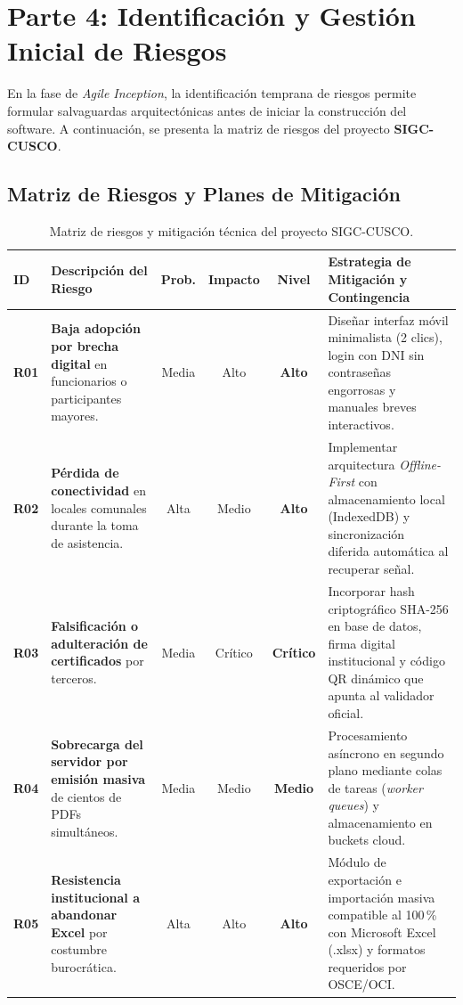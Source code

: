 
\section{Parte 4: Identificación y Gestión Inicial de Riesgos}

En la fase de \textit{Agile Inception}, la identificación temprana de riesgos permite formular salvaguardas arquitectónicas antes de iniciar la construcción del software. A continuación, se presenta la matriz de riesgos del proyecto \textbf{SIGC-CUSCO}.

\subsection{Matriz de Riesgos y Planes de Mitigación}

\begin{table}[H]
\centering
\small
\renewcommand{\arraystretch}{1.2}
\begin{tabularx}{\textwidth}{P{0.8cm}P{3.4cm}cccY}
\toprule
\textbf{ID} & \textbf{Descripción del Riesgo} & \textbf{Prob.} & \textbf{Impacto} & \textbf{Nivel} & \textbf{Estrategia de Mitigación y Contingencia} \\
\midrule
\textbf{R01} & \textbf{Baja adopción por brecha digital} en funcionarios o participantes mayores. & Media & Alto & \textbf{Alto} & Diseñar interfaz móvil minimalista (2 clics), login con DNI sin contraseñas engorrosas y manuales breves interactivos. \\
\midrule
\textbf{R02} & \textbf{Pérdida de conectividad} en locales comunales durante la toma de asistencia. & Alta & Medio & \textbf{Alto} & Implementar arquitectura \textit{Offline-First} con almacenamiento local (IndexedDB) y sincronización diferida automática al recuperar señal. \\
\midrule
\textbf{R03} & \textbf{Falsificación o adulteración de certificados} por terceros. & Media & Crítico & \textbf{Crítico} & Incorporar hash criptográfico SHA-256 en base de datos, firma digital institucional y código QR dinámico que apunta al validador oficial. \\
\midrule
\textbf{R04} & \textbf{Sobrecarga del servidor por emisión masiva} de cientos de PDFs simultáneos. & Media & Medio & \textbf{Medio} & Procesamiento asíncrono en segundo plano mediante colas de tareas (\textit{worker queues}) y almacenamiento en buckets cloud. \\
\midrule
\textbf{R05} & \textbf{Resistencia institucional a abandonar Excel} por costumbre burocrática. & Alta & Alto & \textbf{Alto} & Módulo de exportación e importación masiva compatible al 100\,\% con Microsoft Excel (.xlsx) y formatos requeridos por OSCE/OCI. \\
\bottomrule
\end{tabularx}
\caption{Matriz de riesgos y mitigación técnica del proyecto SIGC-CUSCO.}
\label{tab:riesgos}
\end{table}

